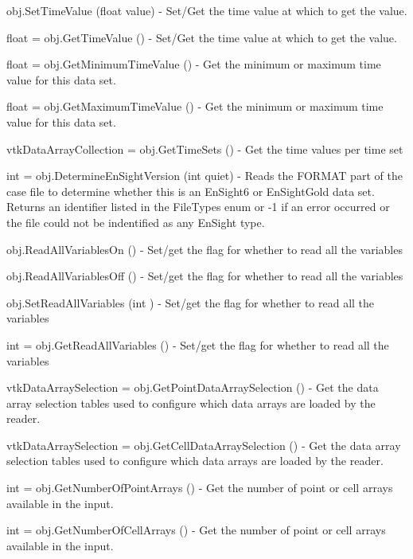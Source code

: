 \begin{DoxyItemize}
\item {\ttfamily obj.\-Set\-Time\-Value (float value)} -\/ Set/\-Get the time value at which to get the value.  
\item {\ttfamily float = obj.\-Get\-Time\-Value ()} -\/ Set/\-Get the time value at which to get the value.  
\item {\ttfamily float = obj.\-Get\-Minimum\-Time\-Value ()} -\/ Get the minimum or maximum time value for this data set.  
\item {\ttfamily float = obj.\-Get\-Maximum\-Time\-Value ()} -\/ Get the minimum or maximum time value for this data set.  
\item {\ttfamily vtk\-Data\-Array\-Collection = obj.\-Get\-Time\-Sets ()} -\/ Get the time values per time set  
\item {\ttfamily int = obj.\-Determine\-En\-Sight\-Version (int quiet)} -\/ Reads the F\-O\-R\-M\-A\-T part of the case file to determine whether this is an En\-Sight6 or En\-Sight\-Gold data set. Returns an identifier listed in the File\-Types enum or -\/1 if an error occurred or the file could not be indentified as any En\-Sight type.  
\item {\ttfamily obj.\-Read\-All\-Variables\-On ()} -\/ Set/get the flag for whether to read all the variables  
\item {\ttfamily obj.\-Read\-All\-Variables\-Off ()} -\/ Set/get the flag for whether to read all the variables  
\item {\ttfamily obj.\-Set\-Read\-All\-Variables (int )} -\/ Set/get the flag for whether to read all the variables  
\item {\ttfamily int = obj.\-Get\-Read\-All\-Variables ()} -\/ Set/get the flag for whether to read all the variables  
\item {\ttfamily vtk\-Data\-Array\-Selection = obj.\-Get\-Point\-Data\-Array\-Selection ()} -\/ Get the data array selection tables used to configure which data arrays are loaded by the reader.  
\item {\ttfamily vtk\-Data\-Array\-Selection = obj.\-Get\-Cell\-Data\-Array\-Selection ()} -\/ Get the data array selection tables used to configure which data arrays are loaded by the reader.  
\item {\ttfamily int = obj.\-Get\-Number\-Of\-Point\-Arrays ()} -\/ Get the number of point or cell arrays available in the input.  
\item {\ttfamily int = obj.\-Get\-Number\-Of\-Cell\-Arrays ()} -\/ Get the number of point or cell arrays available in the input.  

\end{DoxyItemize}
